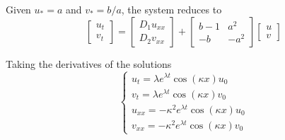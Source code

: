 \documentclass[10pt]{article}
\begin{document}
Given $u_* = a$ and $v_* = b/a$, the system reduces to 
\[\begin{bmatrix}
    u_t\\v_t
\end{bmatrix} = \begin{bmatrix}
    D_1u_{xx}\\
    D_2v_{xx}
\end{bmatrix} + \begin{bmatrix}
    b - 1 & a^2\\
    -b & -a^2
\end{bmatrix}\begin{bmatrix}
    u\\v
\end{bmatrix}\]

Taking the derivatives of the solutions 
\[\begin{cases}
    u_t = \lambda e^{\lambda t} \cos(\kappa x)u_0\\
    v_{t} = \lambda e^{\lambda t} \cos(\kappa x)v_0\\
    u_{xx} = -\kappa^2 e^{\lambda t}\cos(\kappa x) u_0\\
    v_{xx} = -\kappa^2 e^{\lambda t}\cos(\kappa x) v_0
\end{cases}\]
\end{document}
